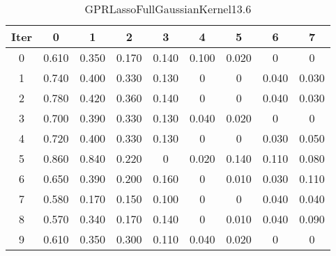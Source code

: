 \begin{table}
	\begin{center}
		\begin{tabular}{|c|c|c|c|c|c|c|c|c|}
			\hline
			Iter & 0 & 1 & 2 & 3 & 4 & 5 & 6 & 7 \\
			\hline
			0 & 0.610 & 0.350 & 0.170 & 0.140 & 0.100 & 0.020 & 0 & 0 \\
			\hline
			1 & 0.740 & 0.400 & 0.330 & 0.130 & 0 & 0 & 0.040 & 0.030 \\
			\hline
			2 & 0.780 & 0.420 & 0.360 & 0.140 & 0 & 0 & 0.040 & 0.030 \\
			\hline
			3 & 0.700 & 0.390 & 0.330 & 0.130 & 0.040 & 0.020 & 0 & 0 \\
			\hline
			4 & 0.720 & 0.400 & 0.330 & 0.130 & 0 & 0 & 0.030 & 0.050 \\
			\hline
			5 & 0.860 & 0.840 & 0.220 & 0 & 0.020 & 0.140 & 0.110 & 0.080 \\
			\hline
			6 & 0.650 & 0.390 & 0.200 & 0.160 & 0 & 0.010 & 0.030 & 0.110 \\
			\hline
			7 & 0.580 & 0.170 & 0.150 & 0.100 & 0 & 0 & 0.040 & 0.040 \\
			\hline
			8 & 0.570 & 0.340 & 0.170 & 0.140 & 0 & 0.010 & 0.040 & 0.090 \\
			\hline
			9 & 0.610 & 0.350 & 0.300 & 0.110 & 0.040 & 0.020 & 0 & 0 \\
			\hline
		\end{tabular}
	\end{center}
	\caption{GPRLassoFullGaussianKernel13.6}
\end{table}